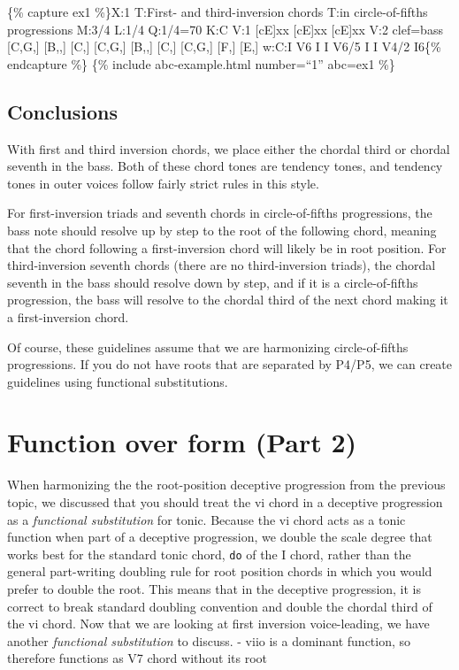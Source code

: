 \documentclass{book}
\begin{document}
\{\% capture ex1 \%\}X:1 T:First- and third-inversion chords T:in
circle-of-fifths progressions M:3/4 L:1/4 Q:1/4=70 K:C V:1
{[}cE{]}xx\textbar{} {[}cE{]}xx\textbar\textbar{} {[}cE{]}xx\textbar{]} V:2
clef=bass {[}C,G,{]} {[}B,,{]} {[}C,{]}\textbar{} {[}C,G,{]} {[}B,,{]}
{[}C,{]}\textbar{} {[}C,G,{]} {[}F,{]} {[}E,{]}\textbar{]} w:C:I V6 I I V6/5 I
I V4/2 I6\{\% endcapture \%\} \{\% include abc-example.html number=``1''
abc=ex1 \%\}

\hypertarget{conclusions-63}{%
\subsection{Conclusions}\label{conclusions-63}}

With first and third inversion chords, we place either the chordal third or
chordal seventh in the bass. Both of these chord tones are tendency tones, and
tendency tones in outer voices follow fairly strict rules in this style.

For first-inversion triads and seventh chords in circle-of-fifths
progressions, the bass note should resolve up by step to the root of the
following chord, meaning that the chord following a first-inversion chord will
likely be in root position. For third-inversion seventh chords (there are no
third-inversion triads), the chordal seventh in the bass should resolve down
by step, and if it is a circle-of-fifths progression, the bass will resolve to
the chordal third of the next chord making it a first-inversion chord.

Of course, these guidelines assume that we are harmonizing circle-of-fifths
progressions. If you do not have roots that are separated by P4/P5, we can
create guidelines using functional substitutions.

\hypertarget{function-over-form-part-2}{%
\section{Function over form (Part 2)}\label{function-over-form-part-2}}

When harmonizing the the root-position deceptive progression from the previous
topic, we discussed that you should treat the vi chord in a deceptive
progression as a \emph{functional substitution} for tonic. Because the vi
chord acts as a tonic function when part of a deceptive progression, we double
the scale degree that works best for the standard tonic chord, \texttt{do} of
the I chord, rather than the general part-writing doubling rule for root
position chords in which you would prefer to double the root. This means that
in the deceptive progression, it is correct to break standard doubling
convention and double the chordal third of the vi chord. Now that we are
looking at first inversion voice-leading, we have another \emph{functional
substitution} to discuss. - viio is a dominant function, so therefore
functions as V7 chord without its root
\end{document}
